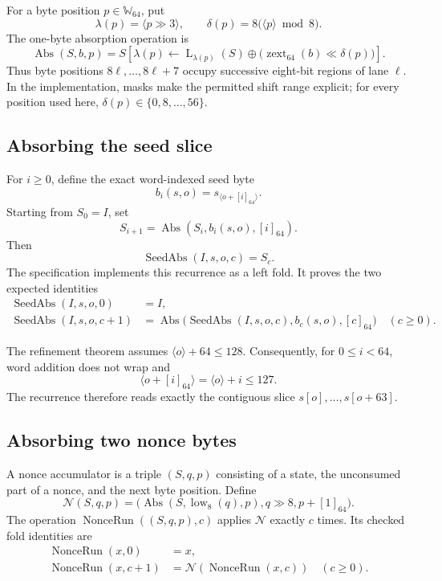 \documentclass[11pt]{article}
\theoremstyle{definition}
\theoremstyle{plain}
\theoremstyle{remark}
\newcommand{\Wlxiv}{\mathbb W_{64}}
\newcommand{\enc}[1]{\left[#1\right]_{64}}
\newcommand{\uint}[1]{\langle #1\rangle}
\newcommand{\Lane}{\operatorname{L}}
\newcommand{\Abs}{\operatorname{Abs}}
\newcommand{\SeedAbs}{\operatorname{SeedAbs}}
\newcommand{\NonceRun}{\operatorname{NonceRun}}
\newcommand{\low}{\operatorname{low}_{8}}
\newcommand{\zext}{\operatorname{zext}_{64}}
\begin{document}
For a byte position $p\in\Wlxiv$, put
\[
  \lambda(p)=\uint{p\mathbin{\gg}3},
  \qquad
  \delta(p)=8\bigl(\uint{p}\bmod 8\bigr).
\]
The one-byte absorption operation is
\begin{equation}
\label{eq:absorb}
  \Abs(S,b,p)
  =S\left[
    \lambda(p)\leftarrow
    \Lane_{\lambda(p)}(S)
      \mathbin{\oplus}
      \bigl(\zext(b)\mathbin{\ll}\delta(p)\bigr)
  \right].
\end{equation}
Thus byte positions $8\ell,\ldots,8\ell+7$ occupy successive eight-bit
regions of lane $\ell$.  In the implementation, masks make the permitted
shift range explicit; for every position used here,
$\delta(p)\in\{0,8,\ldots,56\}$.

\subsection{Absorbing the seed slice}

For $i\ge0$, define the exact word-indexed seed byte
\[
  b_i(s,o)
  =s_{\uint{o+\enc{i}}}.
\]
Starting from $S_0=I$, set
\begin{equation}
\label{eq:seed-rec}
  S_{i+1}=\Abs(S_i,b_i(s,o),\enc{i}).
\end{equation}
Then
\[
  \SeedAbs(I,s,o,c)=S_c.
\]
The specification implements this recurrence as a left fold.  It proves the
two expected identities
\begin{align}
  \SeedAbs(I,s,o,0)&=I,\label{eq:seed-zero}\\
  \SeedAbs(I,s,o,c+1)
    &=\Abs\bigl(\SeedAbs(I,s,o,c),b_c(s,o),\enc{c}\bigr)
      \quad(c\ge0).\label{eq:seed-succ}
\end{align}

The refinement theorem assumes $\uint{o}+64\le128$.  Consequently, for
$0\le i<64$, word addition does not wrap and
\[
  \uint{o+\enc{i}}=\uint{o}+i\le127.
\]
The recurrence therefore reads exactly the contiguous slice
$s[o],\ldots,s[o+63]$.

\subsection{Absorbing two nonce bytes}

A nonce accumulator is a triple $(S,q,p)$ consisting of a state, the
unconsumed part of a nonce, and the next byte position.  Define
\begin{equation}
\label{eq:nonce-step}
  \mathcal N(S,q,p)
  =\bigl(
      \Abs(S,\low(q),p),
      q\mathbin{\gg}8,
      p+\enc{1}
    \bigr).
\end{equation}
The operation $\NonceRun((S,q,p),c)$ applies $\mathcal N$ exactly $c$ times.
Its checked fold identities are
\begin{align}
  \NonceRun(x,0)&=x,\label{eq:nonce-zero}\\
  \NonceRun(x,c+1)&=\mathcal N(\NonceRun(x,c))
    \quad(c\ge0).\label{eq:nonce-succ}
\end{align}
\end{document}
